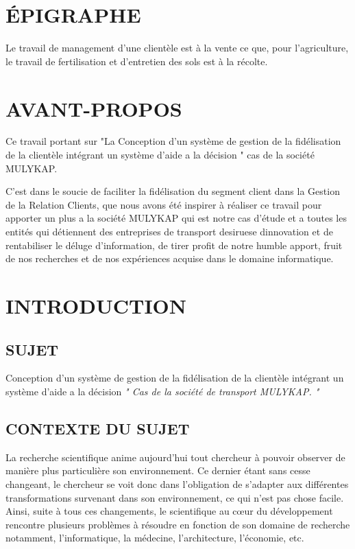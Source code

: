 \documentclass[a4paper,12pt,oneside]{book}
\begin{document}
\frontmatter
\chapter*{ÉPIGRAPHE}
Le travail de management d’une clientèle est à la vente ce
que, pour l’agriculture, le travail de fertilisation et
d’entretien des sols est à la récolte.

\chapter*{AVANT-PROPOS}
Ce travail portant sur "La Conception d’un système de gestion de la fidélisation
de la clientèle intégrant un système d’aide a la décision
" cas de la société MULYKAP.
\newline

C’est dans le soucie de faciliter la fidélisation du segment client
dans la Gestion de la Relation Clients, que nous avons été inspirer
à réaliser ce travail pour apporter un plus a la société MULYKAP
qui est notre cas d’étude et a toutes les entités qui détiennent des entreprises de transport desiruese dinnovation et de rentabiliser le 
déluge d’information, de tirer profit de notre humble apport, fruit
de nos recherches et de nos expériences acquise dans le domaine informatique.


\chapter*{INTRODUCTION}
\section[Sujet]{SUJET}
Conception d’un système de gestion de la fidélisation
de la clientèle intégrant un système d’aide a la décision 
\textit{" Cas de la société de transport MULYKAP. "}
\section[Context du sujet]{CONTEXTE DU SUJET}
La recherche scientifique anime aujourd’hui tout chercheur 
à pouvoir observer de manière
plus particulière son environnement. Ce dernier étant 
sans cesse changeant, le chercheur se voit donc
dans l’obligation de s’adapter aux différentes transformations
survenant dans son environnement, ce qui n’est pas chose facile.
Ainsi, suite à tous ces changements, le scientifique au cœur du
développement rencontre plusieurs problèmes à résoudre en 
fonction de son domaine de recherche notamment, l’informatique,
la médecine, l’architecture, l’économie, etc.
\newline
\end{document}
